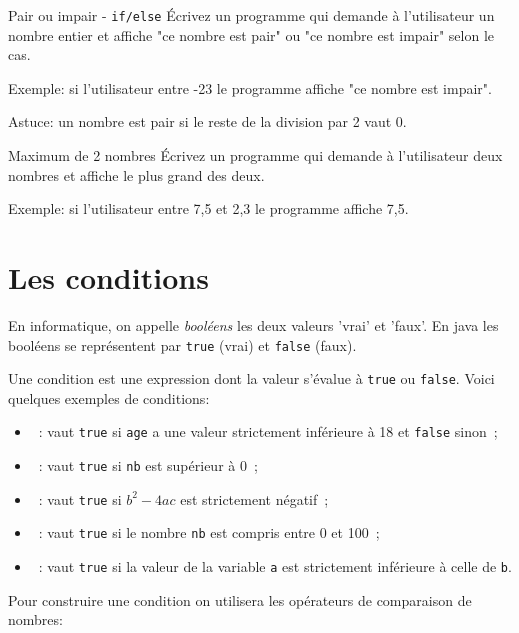 \documentclass[a4paper,11pt]{article}
\begin{document}
	\begin{Exercice}{Pair ou impair - \texttt{if/else}}
		\'Ecrivez un programme qui demande à l'utilisateur 
		un nombre entier et affiche "ce nombre est pair" ou "ce nombre est impair" selon le cas.
				
		Exemple: si l'utilisateur entre -23 le programme affiche "ce nombre est impair". 

		Astuce: un nombre est pair si le reste de la division par 2 vaut 0.
	\end{Exercice}

	\begin{Exercice}{Maximum de 2 nombres}
		\'Ecrivez un programme qui demande à l'utilisateur deux nombres
		et affiche le plus grand des deux.
		
		Exemple: si l'utilisateur entre 7,5 et 2,3 le programme affiche 7,5. 
	\end{Exercice}
	
	\section{Les conditions}

	En informatique, on appelle \emph{booléens} les deux valeurs 'vrai' et 'faux'. 
	En java les booléens se représentent par \texttt{true} (vrai) et \texttt{false}
	(faux).  

	Une condition est une expression dont la valeur s'évalue à \texttt{true} ou 
	\texttt{false}.
	Voici quelques exemples de conditions:

	\begin{itemize}
		\item {}~:  vaut \texttt{true} si \texttt{age} a une valeur 
			strictement inférieure à 18 et \texttt{false} sinon~;
		\item {}~:  vaut \texttt{true} si \texttt{nb} est supérieur à 
			0~;
		\item {}~: vaut \texttt{true} si $b^2-4ac$ est 	
			strictement négatif~;
		\item {}~: vaut \texttt{true} si le nombre 
			\texttt{nb} est compris entre 0 et 100~;
		\item {}~:  vaut \texttt{true} si la valeur de la variable 
			\texttt{a} est strictement inférieure à celle de \texttt{b}.
	\end{itemize}


	Pour construire une condition on utilisera les opérateurs de comparaison de nombres:
	
\end{document}
